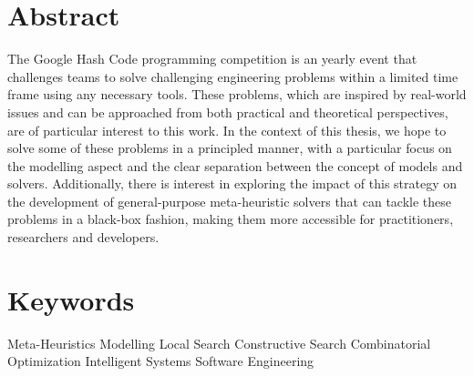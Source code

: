 \thispagestyle{plain}

\section*{Abstract}
\label{sec:abstract}

The Google Hash Code programming competition is an yearly event that
challenges teams to solve challenging engineering problems within a limited
time frame using any necessary tools. These problems, which are inspired
by real-world issues and can be approached from both practical and theoretical perspectives,
are of particular interest to this work. In the context of this thesis,
we hope to solve some of these problems in a principled manner, with a particular
focus on the modelling aspect and the clear separation between the concept of models
and solvers. Additionally, there is interest in exploring the impact of
this strategy on the development of general-purpose meta-heuristic solvers that
can tackle these problems in a black-box fashion, making them more accessible
for practitioners, researchers and developers.

\section*{Keywords}
\label{sec:keywords}
Meta-Heuristics \textbullet{}
Modelling \textbullet{}
Local Search \textbullet{}
Constructive Search \textbullet{}
Combinatorial Optimization \textbullet{}
Intelligent Systems \textbullet{}
Software Engineering
